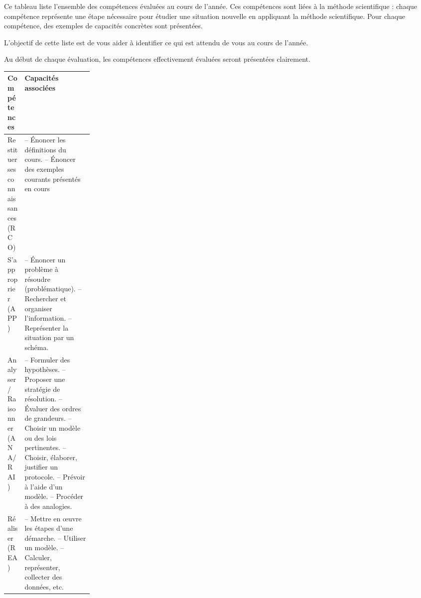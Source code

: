 \pasDePagination


Ce tableau liste l'ensemble des compétences évaluées au cours de l'année.
Ces compétences sont liées à la méthode scientifique : chaque compétence représente une étape nécessaire pour étudier une situation nouvelle en appliquant la méthode scientifique.
Pour chaque compétence, des exemples de capacités concrètes sont présentées.
\bigskip

L'objectif de cette liste est de vous aider à identifier ce qui est attendu de vous au cours de l'année.
\bigskip

Au début de chaque évaluation, les compétences effectivement évaluées seront présentées clairement. 
\bigskip

\begin{tabularx}{\linewidth}{| m{0.2\linewidth} | X |}
  \hline
  \rowcolor{gray!20} 
  \centering \textbf{Compétences} & \textbf{Capacités associées}
  \\ \hline
  \centering Restituer ses connaissances (RCO) &
  -- Énoncer les définitions du cours. \newline
  -- Énoncer des exemples courants présentés en cours
  \\ \hline
  \centering S'approprier (APP) &
  -- Énoncer un problème à résoudre (problématique). \newline
  -- Rechercher et organiser l'information. \newline
  -- Représenter la situation par un schéma.
  \\ \hline
  \centering Analyser/ Raisonner (ANA/RAI) &
  -- Formuler des hypothèses. \newline
  -- Proposer une stratégie de résolution. \newline
  -- Évaluer des ordres de grandeurs. \newline
  -- Choisir un modèle ou des lois pertinentes. \newline
  -- Choisir, élaborer, justifier un protocole. \newline
  -- Prévoir à l'aide d'un modèle. \newline
  -- Procéder à des analogies.
  \\ \hline
  \centering Réaliser (REA) &
  -- Mettre en \oe{}uvre les étapes d'une démarche. \newline
  -- Utiliser un modèle. \newline
  -- Calculer, représenter, collecter des données, etc. \newline

\end{tabularx}

